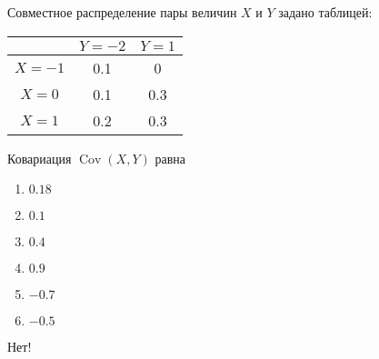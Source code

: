 \documentclass[t]{beamer}
\DeclareMathOperator{\Cov}{Cov}
\begin{document}
 \begin{frame} \label{16-No} 
\begin{block}{16} 

Совместное распределение пары величин $X$ и $Y$ задано таблицей:

\begin{center}
\begin{tabular}{c|cc}
 & $Y=-2$ & $Y=1$ \\
\hline
$X=-1$ & 0.1 & 0 \\
$X=0$ & 0.1 & 0.3 \\
$X=1$ & 0.2 & 0.3 \\
\end{tabular}
\end{center}
\vspace{0.2cm} 
 
 
Ковариация $\Cov(X, Y)$ равна
 


 \end{block} 
\begin{enumerate} 
\item[] \hyperlink{16-Yes}{\beamergotobutton{} $0.18$}
\item[] \hyperlink{16-No}{\beamergotobutton{} $0.1$}
\item[] \hyperlink{16-No}{\beamergotobutton{} $0.4$}
\item[] \hyperlink{16-No}{\beamergotobutton{} $0.9$}
\item[] \hyperlink{16-No}{\beamergotobutton{} $-0.7$}
\item[] \hyperlink{16-No}{\beamergotobutton{} $-0.5$}
\end{enumerate} 

 \alert{Нет!} 
\end{frame} 
\end{document}
